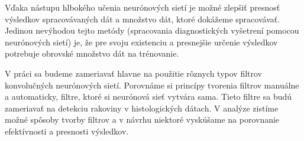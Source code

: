 \hspace{10mm}Vďaka nástupu hlbokého učenia neurónových sietí je možné zlepšiť presnosť  výsledkov spracovávaných dát a množstvo dát, ktoré dokážeme spracovávať. Jedinou nevýhodou tejto metódy (spracovania diagnostických vyšetrení pomocou neurónových sietí)  je, že pre svoju existenciu a presnejšie určenie výsledkov potrebuje obrovské množstvo dát na trénovanie. 

\hspace{10mm}V práci sa budeme zameriavať hlavne na použitie rôznych typov filtrov  konvolučných neurónových sietí. Porovnáme si princípy tvorenia filtrov manuálne a automaticky, filtre, ktoré si neurónová sieť vytvára sama. Tieto filtre sa budú zameriavať na detekciu rakoviny v histologických dátach. V analýze zistíme možné spôsoby tvorby filtrov a v návrhu niektoré vyskúšame na porovnanie efektívnosti a presnosti výsledkov.
